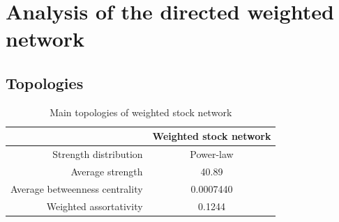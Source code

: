 \section{Analysis of the directed weighted network}
\subsection{Topologies}

\begin{table}
	\begin{center}
		\begin{tabular}{|r|c|}\hline\hline
			&Weighted stock network\\\hline
			Strength distribution&Power-law\\
			Average strength&40.89\\ %
			Average betweenness centrality&0.0007440\\
			Weighted assortativity&0.1244\\ %
			\hline\hline
		\end{tabular}
	\end{center}
	\caption{Main topologies of weighted stock network}\label{tab:weighted}
\end{table}

